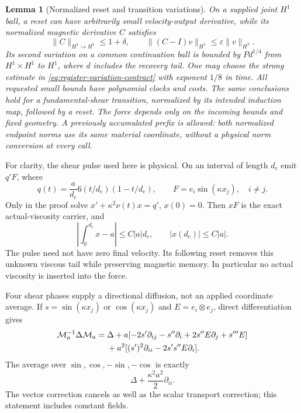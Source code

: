 \documentclass[11pt,a4paper]{amsart}
\newtheorem{lemma}[theorem]{Lemma}
\theoremstyle{definition}
\theoremstyle{remark}
\numberwithin{equation}{section}
\newcommand{\Mcal}{\mathcal M}
\newcommand{\norm}[1]{\lVert #1\rVert}
\begin{document}
\begin{lemma}[Normalized reset and transition variations]\label{lem:register-variations}
On a supplied joint $H^1$ ball, a reset can have arbitrarily small
velocity-output derivative, while its normalized magnetic derivative $C$
satisfies
\begin{equation}\label{eq:register-variation-contract}
 \norm C_{H^1\to H^1}\le1+\delta,\qquad
 \norm{(C-I)v}_{H^1}\le\varepsilon\norm v_{H^3}.
\end{equation}
Its second variation on a common continuation ball is bounded by
$P d^{1/4}$ from $H^1\times H^1$ to $H^1$, where $d$ includes the
recovery tail.  One may choose the strong estimate in
\eqref{eq:register-variation-contract} with exponent $1/8$ in time.
All requested small bounds have polynomial clocks and costs.  The same
conclusions hold for a fundamental-shear transition, normalized by its
intended induction map, followed by a reset.  The force depends only on
the incoming bounds and fixed geometry. A previously accumulated prefix
is allowed: both normalized endpoint norms use its same material
coordinate, without a physical norm conversion at every call.
\end{lemma}

For clarity, the shear pulse used here is physical.  On an interval of
length $d_{\mathrm c}$ emit $q'F$, where
\[
 q(t)=\frac a{d_{\mathrm c}}6(t/d_{\mathrm c})(1-t/d_{\mathrm c}),\qquad
 F=e_i\sin(\kappa x_j),\quad i\ne j.
\]
Only in the proof solve $x'+\kappa^2\nu(t)x=q'$, $x(0)=0$.
Then $xF$ is the exact actual-viscosity carrier, and
\begin{equation}\label{eq:register-shear-tail}
 \left|\int_0^{d_{\mathrm c}}x-a\right|\le C|a|d_{\mathrm c},\qquad
 |x(d_{\mathrm c})|\le C|a|.
\end{equation}
The pulse need not have zero final velocity.  Its following reset removes
this unknown viscous tail while preserving magnetic memory.  In
particular no actual viscosity is inserted into the force.

Four shear phases supply a directional diffusion, not an applied coordinate
average.  If $s=\sin(\kappa x_j)$ or $\cos(\kappa x_j)$ and
$E=e_i\otimes e_j$, direct differentiation gives
\begin{align}\label{eq:register-vector-shear}
 \Mcal_a^{-1}\Delta\Mcal_a={}&\Delta
 +a[-2s'\partial_{ij}-s''\partial_i+2s''E\partial_j+s'''E]\notag\\
 &+a^2[(s')^2\partial_{ii}-2s's''E\partial_i].
\end{align}
The average over $\sin,\cos,-\sin,-\cos$ is exactly
\begin{equation}\label{eq:register-directional-average}
 \Delta+\frac{\kappa^2a^2}{2}\partial_{ii}.
\end{equation}
The vector correction cancels as well as the scalar transport correction;
this statement includes constant fields.
\end{document}
